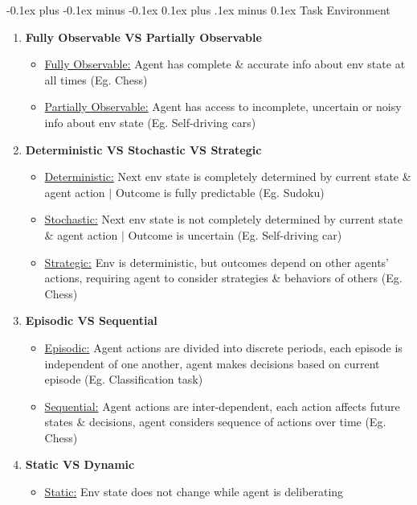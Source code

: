 \documentclass[landscape]{article}
\makeatletter
\renewcommand{\subsection}{\@startsection{subsection}{2}{0mm}%
  {-0.1ex plus -0.1ex minus -0.1ex}%
  {0.1ex plus .1ex minus 0.1ex}%
{\normalfont\scriptsize\bfseries}}
\makeatother
\begin{document}
\begin{multicols*}{5}
    \subsection{Task Environment}
    \begin{enumerate}
      \item \textbf{Fully Observable VS Partially Observable}
      \begin{itemize}
        \item \underline{Fully Observable:} Agent has complete \& accurate info about env state at all times (Eg. Chess)
        \item \underline{Partially Observable:} Agent has access to incomplete, uncertain or noisy info about env state (Eg. Self-driving cars)
      \end{itemize}
      \item \textbf{Deterministic VS Stochastic VS Strategic}
      \begin{itemize}
        \item \underline{Deterministic:} Next env state is completely determined by current state \& agent action $\vert$ Outcome is fully predictable (Eg. Sudoku)
        \item \underline{Stochastic:} Next env state is not completely determined by current state \& agent action $\vert$ Outcome is uncertain (Eg. Self-driving car)
        \item \underline{Strategic:} Env is deterministic, but outcomes depend on other agents' actions, requiring agent to consider strategies \& behaviors of others (Eg. Chess)
      \end{itemize}
      \item \textbf{Episodic VS Sequential}
      \begin{itemize}
        \item \underline{Episodic:} Agent actions are divided into discrete periods, each episode is independent of one another, agent makes decisions based on current episode (Eg. Classification task)
        \item \underline{Sequential:} Agent actions are inter-dependent, each action affects future states \& decisions, agent considers sequence of actions over time (Eg. Chess)
      \end{itemize}
      \item \textbf{Static VS Dynamic}
      \begin{itemize}
        \item \underline{Static:} Env state does not change while agent is deliberating

\end{itemize}
\end{enumerate}
\end{multicols*}
\end{document}
